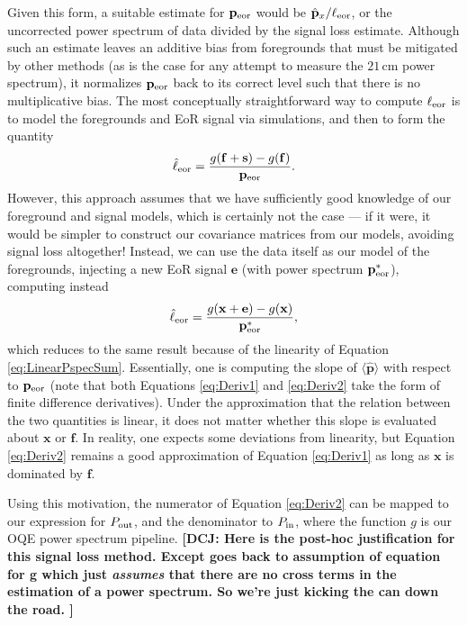 \documentclass[preprint2,numberedappendix,tighten]{aastex6}  %
\newcommand{\x}{\mathbf{x}}
\newcommand{\f}{\mathbf{f}}
\newcommand{\s}{\mathbf{s}}
\newcommand{\e}{\mathbf{e}}
\newcommand{\p}{\mathbf{p}}
\newcommand{\phat}{\hat{\mathbf{p}}}
\newcommand{\dcj}[1]{{\color{orange} \textbf{[DCJ: #1]}}}
\begin{document}
Given this form, a suitable estimate for $\p_{\rm eor}$ would be $\phat_{x} / \ell_{\rm eor}$, or the uncorrected power spectrum of data divided by the signal loss estimate. Although such an estimate leaves an additive bias from foregrounds that must be mitigated by other methods (as is the case for any attempt to measure the $21\,\textrm{cm}$ power spectrum), it normalizes $\p_{\rm eor}$ back to its correct level such that there is no multiplicative bias. The most conceptually straightforward way to compute $\ell_{\rm eor}$ is to model the foregrounds and EoR signal via simulations, and then to form the quantity
\begin{equation}
\label{eq:Deriv1}
\hat{\ell}_{\rm eor} = \frac{g(\f + \s) - g(\f)}{\p_{\rm eor}}.
\end{equation}
However, this approach assumes that we have sufficiently good knowledge of our foreground and signal models, which is certainly not the case --- if it were, it would be simpler to construct our covariance matrices from our models, avoiding signal loss altogether! Instead, we can use the data itself as our model of the foregrounds, injecting a new EoR signal $\e$ (with power spectrum $\p^*_{\rm eor}$), computing instead
\begin{equation}
\label{eq:Deriv2}
\hat{\ell}_{\rm eor} = \frac{g(\x+ \e) - g(\x)}{\p^*_{\rm eor}},
\end{equation}
which reduces to the same result because of the linearity of Equation \eqref{eq:LinearPspecSum}. Essentially, one is computing the slope of $\langle \phat \rangle$ with respect to $\p_{\rm eor}$ (note that both Equations \eqref{eq:Deriv1} and \eqref{eq:Deriv2} take the form of finite difference derivatives). Under the approximation that the relation between the two quantities is linear, it does not matter whether this slope is evaluated about $\x$ or $\f$. In reality, one expects some deviations from linearity, but Equation \eqref{eq:Deriv2} remains a good approximation of Equation \eqref{eq:Deriv1} as long as $\x$ is dominated by $\f$. 

Using this motivation, the numerator of Equation \eqref{eq:Deriv2} can be mapped to our expression for $P_{\rm out}$, and the denominator to $P_{\rm in}$, where the function $g$ is our OQE power spectrum pipeline. \dcj{Here is the post-hoc justification for this signal loss method.  Except goes back to assumption of equation for g which just \emph{assumes} that there are no cross terms in the estimation of a power spectrum. So we're just kicking the can down the road. }
\end{document}
